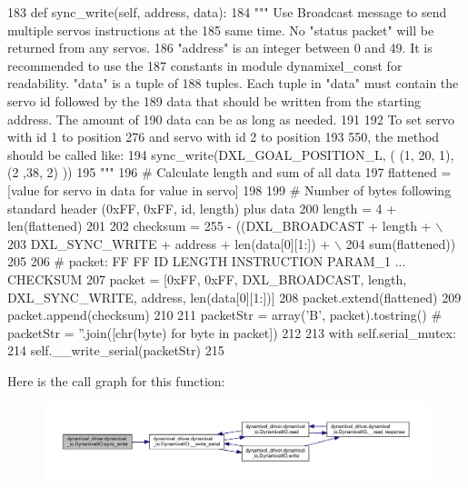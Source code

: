 \begin{DoxyCode}
183     \textcolor{keyword}{def }sync\_write(self, address, data):
184         \textcolor{stringliteral}{""" Use Broadcast message to send multiple servos instructions at the}
185 \textcolor{stringliteral}{        same time. No "status packet" will be returned from any servos.}
186 \textcolor{stringliteral}{        "address" is an integer between 0 and 49. It is recommended to use the}
187 \textcolor{stringliteral}{        constants in module dynamixel\_const for readability. "data" is a tuple of}
188 \textcolor{stringliteral}{        tuples. Each tuple in "data" must contain the servo id followed by the}
189 \textcolor{stringliteral}{        data that should be written from the starting address. The amount of}
190 \textcolor{stringliteral}{        data can be as long as needed.}
191 \textcolor{stringliteral}{}
192 \textcolor{stringliteral}{        To set servo with id 1 to position 276 and servo with id 2 to position}
193 \textcolor{stringliteral}{        550, the method should be called like:}
194 \textcolor{stringliteral}{            sync\_write(DXL\_GOAL\_POSITION\_L, ( (1, 20, 1), (2 ,38, 2) ))}
195 \textcolor{stringliteral}{        """}
196         \textcolor{comment}{# Calculate length and sum of all data}
197         flattened = [value \textcolor{keywordflow}{for} servo \textcolor{keywordflow}{in} data \textcolor{keywordflow}{for} value \textcolor{keywordflow}{in} servo]
198 
199         \textcolor{comment}{# Number of bytes following standard header (0xFF, 0xFF, id, length) plus data}
200         length = 4 + len(flattened)
201 
202         checksum = 255 - ((DXL\_BROADCAST + length + \(\backslash\)
203                           DXL\_SYNC\_WRITE + address + len(data[0][1:]) + \(\backslash\)
204                           sum(flattened)) %
205 
206         \textcolor{comment}{# packet: FF  FF  ID LENGTH INSTRUCTION PARAM\_1 ... CHECKSUM}
207         packet = [0xFF, 0xFF, DXL\_BROADCAST, length, DXL\_SYNC\_WRITE, address, len(data[0][1:])]
208         packet.extend(flattened)
209         packet.append(checksum)
210 
211         packetStr = array(\textcolor{stringliteral}{'B'}, packet).tostring() \textcolor{comment}{# packetStr = ''.join([chr(byte) for byte in packet])}
212 
213         with self.serial\_mutex:
214             self.\_\_write\_serial(packetStr)
215 
\end{DoxyCode}
Here is the call graph for this function\+:
\nopagebreak
\begin{figure}[H]
\begin{center}
\leavevmode
\includegraphics[width=350pt]{dd/d77/classdynamixel__driver_1_1dynamixel__io_1_1_dynamixel_i_o_aa61b3e4c17b04db3e5fa94f4f81a961d_cgraph}
\end{center}
\end{figure}
